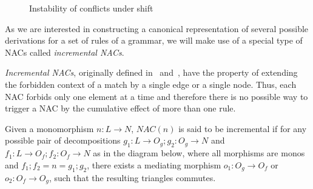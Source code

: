 \begin{figure}[!ht]
  \centering
  \caption{Instability of conflicts under shift\\}\label{fig:process:instability}
\end{figure}

As we are interested in constructing a canonical representation of several possible derivations for a set of rules of a grammar, we will make use of a special type of NACs called \emph{incremental NACs}.

\emph{Incremental NACs}, originally defined in~\cite{Corradini2013} and~\cite{Corradini2014}, have the property of extending the forbidden context of a match by a single edge or a single node. Thus, each NAC forbids only one element at a time and therefore there is no possible way to trigger a NAC by the cumulative effect of more than one rule.

\begin{definition} Given a monomorphism \mbox{$n : L \rightarrow N$}, $NAC(n)$ is said to be incremental if for any possible pair of decompositions \mbox{$g_1 : L \rightarrow O_g;g_2 : O_g \rightarrow N$} and \mbox{$f_1 : L \rightarrow O_f;f_2 : O_f \rightarrow N$} as in the diagram below, where all morphisms are monos and \mbox{$f_1;f_2 = n = g_1;g_2$}, there exists a mediating morphism $o_1 : O_g \rightarrow O_f$ or $o_2 : O_f \rightarrow O_g$, such that the resulting triangles
  commutes.


\end{definition}

